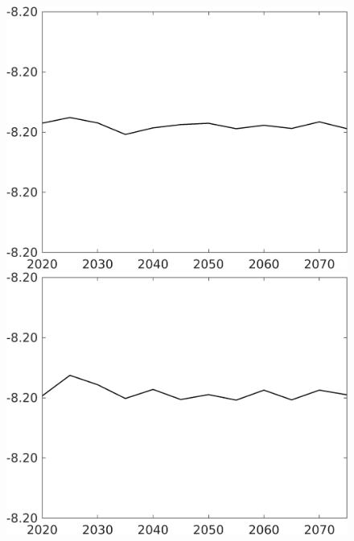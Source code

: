 \documentclass[12pt]{article}
\begin{document}
\begin{figure}[h!!]
\begin{minipage}[]{0.32\textwidth}
	\end{minipage}	
	\begin{minipage}[]{0.32\textwidth}
		\includegraphics[width=1\textwidth]{../../codding_model/own_basedOnFried/optimalPol_010922_revision/figures/all_13Sept22/CompTaul_LFBAUPer_Reg0_F_spillover0_nsk1_xgr0_knspil0_sep1_countec0_GovRev0_etaa0.79.png}
	\end{minipage}	
	\begin{minipage}[]{0.32\textwidth}
		\includegraphics[width=1\textwidth]{../../codding_model/own_basedOnFried/optimalPol_010922_revision/figures/all_13Sept22/CompTaul_LFBAUPer_Reg0_G_spillover0_nsk1_xgr0_knspil0_sep1_countec0_GovRev0_etaa0.79.png}

\end{minipage}
\end{figure}
\end{document}
